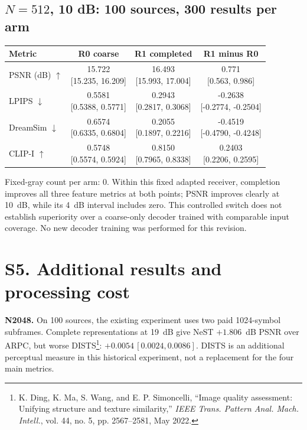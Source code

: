 \documentclass[11pt,letterpaper]{article}
\begin{document}
\subsection*{$N=512$, 10 dB: 100 sources, 300 results per arm}
\begin{center}\small\setlength{\tabcolsep}{7pt}\renewcommand{\arraystretch}{1.55}
\begin{tabular}{lccc}
\toprule
Metric & R0 coarse & R1 completed & R1 minus R0\\\midrule
PSNR (dB) $\uparrow$ & \shortstack{15.722\\{}[15.235, 16.209]} & \shortstack{16.493\\{}[15.993, 17.004]} & \shortstack{0.771\\{}[0.563, 0.986]}\\
LPIPS $\downarrow$ & \shortstack{0.5581\\{}[0.5388, 0.5771]} & \shortstack{0.2943\\{}[0.2817, 0.3068]} & \shortstack{-0.2638\\{}[-0.2774, -0.2504]}\\
DreamSim $\downarrow$ & \shortstack{0.6574\\{}[0.6335, 0.6804]} & \shortstack{0.2055\\{}[0.1897, 0.2216]} & \shortstack{-0.4519\\{}[-0.4790, -0.4248]}\\
CLIP-I $\uparrow$ & \shortstack{0.5748\\{}[0.5574, 0.5924]} & \shortstack{0.8150\\{}[0.7965, 0.8338]} & \shortstack{0.2403\\{}[0.2206, 0.2595]}\\
\bottomrule\end{tabular}\end{center}
Fixed-gray count per arm: 0.
Within this fixed adapted receiver, completion improves all three feature metrics at both points; PSNR improves clearly at 10~dB, while its 4~dB interval includes zero. This controlled switch does not establish superiority over a coarse-only decoder trained with comparable input coverage. No new decoder training was performed for this revision.

\clearpage\section*{S5. Additional results and processing cost}
\textbf{N2048.} On 100 sources, the existing experiment uses two paid 1024-symbol subframes. Complete representations at 19~dB give NeST $+1.806$~dB PSNR over ARPC, but worse DISTS\footnote{K. Ding, K. Ma, S. Wang, and E. P. Simoncelli, ``Image quality assessment: Unifying structure and texture similarity,'' \emph{IEEE Trans. Pattern Anal. Mach. Intell.}, vol. 44, no. 5, pp. 2567--2581, May 2022.}: $+0.0054\,[0.0024,0.0086]$. DISTS is an additional perceptual measure in this historical experiment, not a replacement for the four main metrics.
\end{document}
